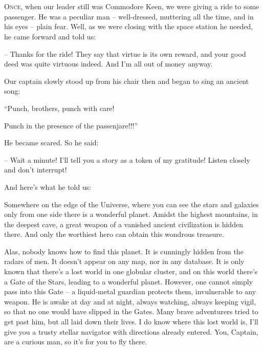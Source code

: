 \documentclass[ebook,twoside,final,openright]{memoir}
\begin{document}
\chapter{}
\par
\lettrine{O}{nce,} when our leader still was Commodore Keen, we were giving a ride to some passenger. He was a peculiar man – well-dressed, muttering all the time, and in his eyes – plain fear. Well, as we were closing with the space station he needed, he came forward and told us: \par
\par
– Thanks for the ride! They say that virtue is its own reward, and your good deed was quite virtuous indeed. And I’m all out of money anyway.\par
Our captain slowly stood up from his chair then and began to sing an ancient song: \par
“Punch, brothers, punch with care! \par
 Punch in the presence of the passenjare!!!” \par
He became scared. So he said:\par
– Wait a minute! I'll tell you a story as a token of my gratitude! Listen closely and don’t interrupt! \par
 And here’s what he told us:\par
\par
Somewhere on the edge of the Universe, where you can see the stars and galaxies only from one side there is a wonderful planet. Amidst the highest mountains, in the deepest cave, a great weapon of a vanished ancient civilization is hidden there. And only the worthiest hero can obtain this wondrous treasure. \par
Alas, nobody knows how to find this planet. It is cunningly hidden from the radars of men. It doesn’t appear on any map, nor in any database. It is only known that there’s a lost world in one globular cluster, and on this world there’s a Gate of the Stars, leading to a wonderful planet. However, one cannot simply pass into this Gate – a liquid-metal guardian protects them, invulnerable to any weapon. He is awake at day and at night, always watching, always keeping vigil, so that no one would have slipped in the Gates. Many brave adventurers tried to get past him, but all laid down their lives. I do know where this lost world is, I'll give you a trusty stellar navigator with directions already entered. You, Captain, are a curious man, so it’s for you to fly there.\par
\par
\end{document}
